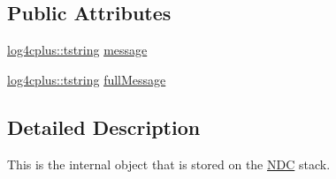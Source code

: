 \subsection*{Public Attributes}
\begin{DoxyCompactItemize}
\item 
\hyperlink{namespacelog4cplus_a3c9287f6ebcddc50355e29d71152117b}{log4cplus\-::tstring} \hyperlink{structlog4cplus_1_1DiagnosticContext_a4f8953ae0220f13316a5905de32da0e3}{message}
\item 
\hyperlink{namespacelog4cplus_a3c9287f6ebcddc50355e29d71152117b}{log4cplus\-::tstring} \hyperlink{structlog4cplus_1_1DiagnosticContext_a4fce057627f5e1cec7a59a4ed4111f11}{full\-Message}
\end{DoxyCompactItemize}


\subsection{Detailed Description}
This is the internal object that is stored on the \hyperlink{classlog4cplus_1_1NDC}{N\-D\-C} stack. 

